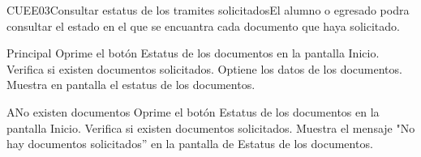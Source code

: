 \begin{UseCase}{CUEE03}{Consultar estatus de los tramites solicitados}{El alumno o egresado podra consultar el estado en el que se encuantra cada documento que haya solicitado.}
	
	
	
\end{UseCase}

\begin{UCtrayectoria}{Principal}
	\UCpaso [\UCactor] Oprime el botón Estatus de los documentos en la pantalla Inicio.
	\UCpaso Verifica si existen documentos solicitados.
	\UCpaso Optiene los datos de los documentos.
	\UCpaso Muestra en pantalla el estatus de los documentos.
\end{UCtrayectoria}

\begin{UCtrayectoriaA}{A}{No existen documentos}
	\UCpaso [\UCactor] Oprime el botón Estatus de los documentos en la pantalla Inicio.
	\UCpaso Verifica si existen documentos solicitados.
	\UCpaso Muestra el mensaje "No hay documentos solicitados'' en la pantalla de Estatus de los documentos.
\end{UCtrayectoriaA}
